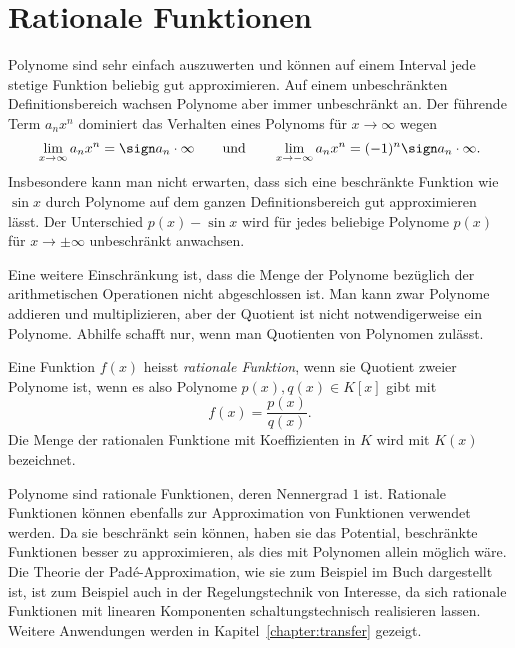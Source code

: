 %
%
%
\section{Rationale Funktionen
\label{buch:polynome:section:rationale-funktionen}}
Polynome sind sehr einfach auszuwerten und können auf einem
Interval jede stetige Funktion beliebig gut approximieren.
Auf einem unbeschränkten Definitionsbereich wachsen Polynome aber
immer unbeschränkt an.
Der führende Term $a_nx^n$ dominiert das Verhalten eines Polynoms
für $x\to\infty$ wegen
\[
\lim_{x\to\infty} a_nx^n
=
\sign a_n \cdot\infty
\qquad\text{und}\qquad
\lim_{x\to-\infty} a_nx^n
=
(-1)^n \sign a_n\cdot \infty.
\]
Insbesondere kann man nicht erwarten, dass sich eine beschränkte
Funktion wie $\sin x$ durch Polynome auf dem ganzen Definitionsbereich
gut approximieren lässt.
Der Unterschied $p(x)-\sin x$ wird für jedes beliebige Polynome $p(x)$
für $x\to\pm\infty$ unbeschränkt anwachsen.

Eine weitere Einschränkung ist, dass die Menge der Polynome bezüglich
der arithmetischen Operationen nicht abgeschlossen ist.
Man kann zwar Polynome addieren und multiplizieren, aber der Quotient
ist nicht notwendigerweise ein Polynome.
Abhilfe schafft nur, wenn man Quotienten von Polynomen zulässt.

\begin{definition}
Eine Funktion $f(x)$ heisst {\em rationale Funktion}, wenn sie Quotient
%
zweier Polynome ist, wenn es also Polynome $p(x), q(x)\in K[x]$ gibt mit
\[
f(x) = \frac{p(x)}{q(x)}.
\]
Die Menge der rationalen Funktione mit Koeffizienten in $K$ wird mit
$K(x)$ bezeichnet.
\end{definition}

Polynome sind rationale Funktionen, deren Nennergrad $1$ ist.
Rationale Funktionen können ebenfalls zur Approximation von Funktionen
verwendet werden.
Da sie beschränkt sein können, haben sie das Potential, 
beschränkte Funktionen besser zu approximieren, als dies mit 
Polynomen allein möglich wäre.
Die Theorie der Padé-Approximation, wie sie zum Beispiel im Buch
\cite{buch:pade} dargestellt ist, ist zum Beispiel auch in der
Regelungstechnik von Interesse, da sich rationale Funktionen mit
linearen Komponenten schaltungstechnisch realisieren lassen.
Weitere Anwendungen werden in Kapitel~\ref{chapter:transfer}
gezeigt.


